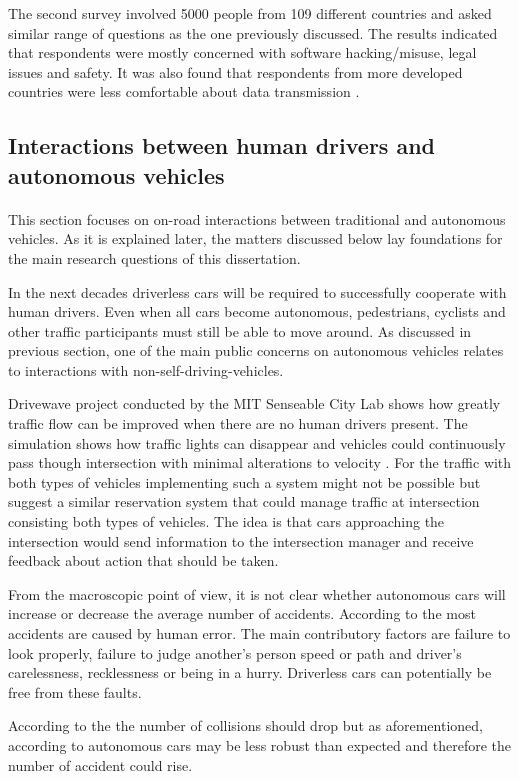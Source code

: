 \documentclass[11pt,english,twoside]{article}
\begin{document}
\par

The second survey involved 5000 people from 109 different countries and asked similar range of questions as the one previously discussed. The results indicated that respondents were mostly concerned with software hacking/misuse, legal issues and safety. It was also found that respondents from more developed countries were less comfortable about data transmission \citep{kyriakidis2015public}.



\subsection{Interactions between human drivers and autonomous vehicles}
\paragraph{}
This section focuses on on-road interactions between traditional and autonomous vehicles. As it is explained later, the matters discussed below lay foundations for the main research questions of this dissertation.

\par
In the next decades driverless cars will be required to successfully cooperate with human drivers. Even when all cars become autonomous, pedestrians, cyclists and other traffic participants must still be able to move around. As discussed in previous section, one of the main public concerns on autonomous vehicles relates to interactions with non-self-driving-vehicles.

\par
Drivewave project conducted by the MIT Senseable City Lab shows how greatly traffic flow can be  improved when there are no human drivers present. The simulation shows how traffic lights can disappear and vehicles could continuously pass though intersection with minimal alterations to velocity \citep{drivewave}. For the traffic with both types of vehicles implementing such a system might not be possible but \citet{dresner2007sharing} suggest a similar reservation system that could manage traffic at intersection consisting both types of vehicles. The idea is that cars approaching the intersection would send information to the intersection manager and receive feedback about action that should be taken.





\par
From the macroscopic point of view, it is not clear whether autonomous cars will increase or decrease the average number of accidents. According to the \citet{excel} most accidents are caused by human error. The main contributory factors are failure to look properly, failure to judge another's person speed or path and driver's carelessness, recklessness or being in a hurry. Driverless cars can potentially be free from these faults.
\par
According to the \citet{pathwaytodriverless} the number of collisions should drop but as aforementioned, according to \citet{sivak2015road}  autonomous cars may be less robust than expected and therefore the number of accident could rise. 
\end{document}

